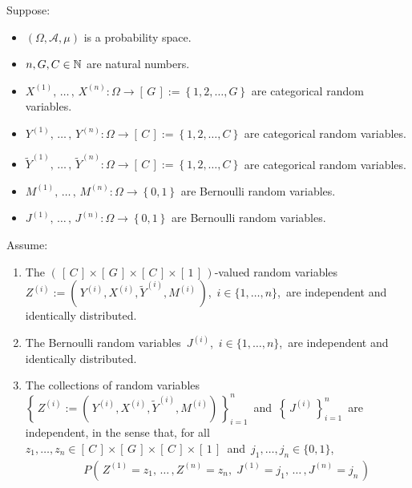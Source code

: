 \begin{theorem}
\mbox{}\vskip 0.1cm\noindent
Suppose:
\begin{itemize}
\item
	$\left(\Omega,\mathcal{A},\mu\right)$ is a probability space.
\item
	$n, G, C \in \mathbb{N}$ are natural numbers.
\item
	$X^{(1)}, \,\ldots\,,\, X^{(n)} : \Omega \longrightarrow \left[\,G\,\right] := \left\{1,2,\ldots,G\right\}$
	are categorical random variables.
\item
	$Y^{(1)}, \,\ldots\,,\, Y^{(n)} : \Omega \longrightarrow \left[\,C\,\right] := \left\{1,2,\ldots,C\right\}$
	are categorical random variables.
\item
	$\widetilde{Y}^{(1)}, \,\ldots\,,\, \widetilde{Y}^{(n)} : \Omega \longrightarrow \left[\,C\,\right] := \left\{1,2,\ldots,C\right\}$
	are categorical random variables.
\item
	$M^{(1)}, \,\ldots\,,\, M^{(n)} : \Omega \longrightarrow \left\{0,1\right\}$
	are Bernoulli random variables.
\item
	$J^{(1)}, \,\ldots\,,\, J^{(n)} : \Omega \longrightarrow \left\{0,1\right\}$
	are Bernoulli random variables.
\end{itemize}
Assume:
\renewcommand{\theenumi}{\alph{enumi}}
\renewcommand{\labelenumi}{\textnormal{(\theenumi)}$\;\;$}
\begin{enumerate}
\item\label{iIndependence}
	The $\left(\,\left[\,C\,\right] \times \left[\,G\,\right] \times \left[\,C\,\right] \times \left[\,1\,\right]\,\right)$-valued
	random variables
	\,$Z^{(i)} := \left(\,Y^{(i)},X^{(i)},\widetilde{Y}^{(i)},M^{(i)}\,\right)$,
	\,$i \in \{1, \ldots, n\}$,
	\,are independent and identically distributed.
\item\label{Jindependence}
	The Bernoulli random variables \,$J^{(i)}$, \,$i \in \{1, \ldots, n\}$, \,are independent and identically distributed.
\item\label{ZJindependence}
	The collections of random variables
	\,$\left\{\,Z^{(i)} := \left(\,Y^{(i)},X^{(i)},\widetilde{Y}^{(i)},M^{(i)}\right)\,\right\}_{i=1}^{n}$\,
	and
	\,$\left\{\,J^{(i)}\,\right\}_{i=1}^{n}$\,
	are independent, in the sense that, for all
	\,$z_{1}, \ldots, z_{n} \in \left[\,C\,\right] \times \left[\,G\,\right] \times \left[\,C\,\right] \times \left[\,1\,\right]$\,
	and
	\,$j_{1}, \ldots, j_{n} \in \{0,1\}$,\,
	\begin{eqnarray*}
	&&
		P\!\left(\,Z^{(1)}=z_{1},\,\ldots\,,Z^{(n)}=z_{n},\;J^{(1)}=j_{1},\,\ldots\,,J^{(n)}=j_{n}\,\right)

\end{eqnarray*}
\end{enumerate}
\end{theorem}
